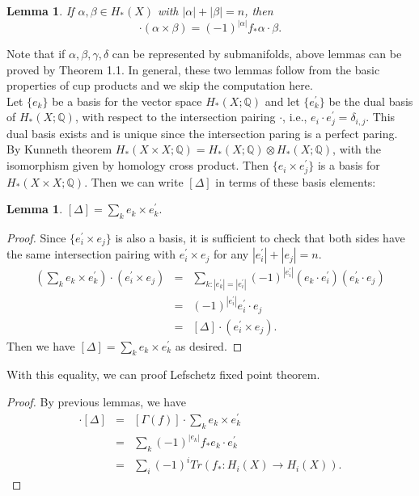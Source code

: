\documentclass[psamsfonts]{amsart}
\newtheorem{lem}[theorem]{Lemma}
\theoremstyle{definition}
\theoremstyle{remark}
\numberwithin{equation}{section}
\begin{document}
		\begin{lem}
			If $\alpha , \beta \in H_*(X)$ with $|\alpha|+|\beta| = n$, then
			\begin{equation}
				[\Gamma(f)]\cdot (\alpha \times \beta) = (-1)^{|\alpha|}f_*\alpha \cdot \beta.
			\end{equation}
		\end{lem}
		Note that if $\alpha, \beta, \gamma, \delta$ can be represented by submanifolds, above lemmas can be proved by Theorem 1.1. In general, these two lemmas follow from the basic properties of cup products and we skip the computation here.\\
		\indent Let $\{ e_k \}$ be a basis for the vector space $H_*(X;\mathbb{Q})$ and let $\{ e_k ^\prime \}$ be the dual basis of $H_*(X;\mathbb{Q})$, with respect to the intersection pairing $\cdot$, i.e., $e_i \cdot e_j^\prime = \delta_{i,j}$. This dual basis exists and is unique since the intersection paring is a perfect paring.\\
		\indent By Kunneth theorem $H_*(X \times X; \mathbb{Q}) = H_*(X;\mathbb{Q}) \otimes H_*(X;\mathbb{Q})$, with the isomorphism given by homology cross product. Then $\{ e_i \times e_j^\prime \}$ is a basis for $H_*(X \times X; \mathbb{Q})$. Then we can write $[\Delta]$ in terms of these basis elements:
		\begin{lem}
			$[\Delta] = \sum_k e_k \times e_k^\prime .$
		\end{lem}
		\begin{proof}
			Since $\{ e_i^\prime \times e_j \}$ is also a basis, it is sufficient to check that both sides have the same intersection pairing with $e_i^\prime \times e_j$ for any $|e_i^\prime|+ |e_j| = n$.
			\begin{eqnarray}
				(\sum_k e_k \times e_k^\prime) \cdot (e_i^\prime \times e_j) &=& \sum_{k:|e_k^\prime| = |e_i^\prime|} (-1)^{|e_i^\prime|} (e_k \cdot e_i^\prime)(e_k^\prime \cdot e_j) \\
				&=& (-1)^{|e_i^\prime|} e_i^\prime \cdot e_j \\
				&=& [\Delta] \cdot (e_i^\prime \times e_j).
			\end{eqnarray}
			Then we have $[\Delta] = \sum_k e_k \times e_k^\prime$ as desired.
		\end{proof}
		
		With this equality, we can proof Lefschetz fixed point theorem.
		\begin{proof}
			By previous lemmas, we have
			\begin{eqnarray}
				[\Gamma(f)] \cdot [\Delta] &=& [\Gamma(f)] \cdot \sum_k e_k \times e_k^\prime \\
				&=& \sum_k (-1)^{|e_k|} f_* e_k \cdot e_k^\prime \\
				&=& \sum_i (-1)^i Tr(f_*: H_i(X) \to H_i(X)).
			\end{eqnarray}
		\end{proof}
\end{document}
